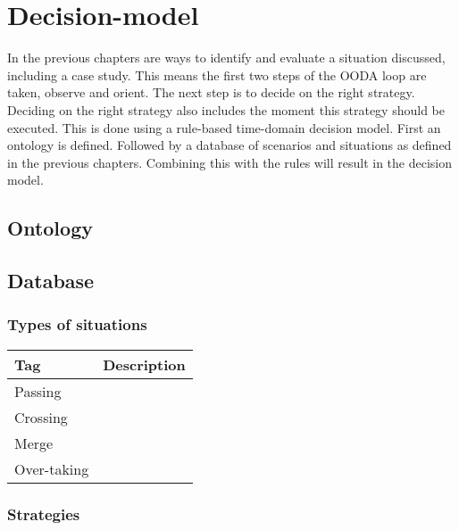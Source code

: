 \chapter{Decision-model}
In the previous chapters are ways to identify and evaluate a situation discussed, including a case study. This means the first two steps of the OODA loop are taken, observe and orient. The next step is to decide on the right strategy. Deciding on the right strategy also includes the moment this strategy should be executed. 
This is done using a rule-based time-domain decision model. First an ontology is defined. Followed by a database of scenarios and situations as defined in the previous chapters. Combining this with the rules will result in the decision model. 

\section{Ontology}


\section{Database}

\subsection{Types of situations}
\begin{table}[h]
	\begin{tabular}{l|l}
		Tag & Description\\
		\hline
		Passing & \\
		Crossing & \\
		Merge & \\
		Over-taking & \\
	\end{tabular}
	
	\label{tab:situations}
\end{table}

\subsection{Strategies}

